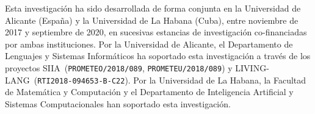 \vspace*{\fill}

\noindent Esta investigación ha sido desarrollada de forma conjunta en la Universidad de Alicante (España) y la Universidad de La Habana (Cuba), entre noviembre de 2017 y septiembre de 2020, en sucesivas estancias de investigación co-financiadas por ambas instituciones. Por la Universidad de Alicante, el Departamento de Lenguajes y Sistemas Informáticos ha soportado esta investigación a través de los proyectos SIIA~(\texttt{PROMETEO/2018/089}, \texttt{PROMETEU/2018/089}) y LIVING-LANG~(\texttt{RTI2018-094653-B-C22}). Por la Universidad de La Habana, la Facultad de Matemática y Computación y el Departamento de Inteligencia Artificial y Sistemas Computacionales han soportado esta investigación.

